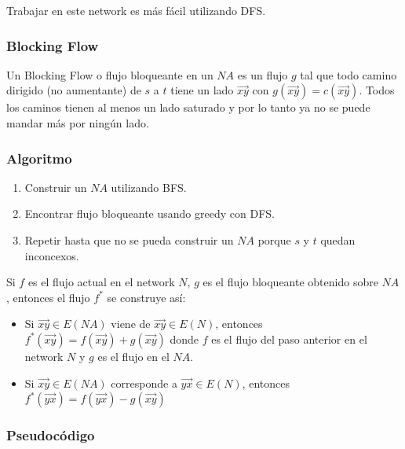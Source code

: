 \documentclass[10pt,a4paper]{article}
\begin{document}
Trabajar en este network es más fácil utilizando DFS.

\subsubsection*{Blocking Flow}

Un Blocking Flow o flujo bloqueante en un $NA$ es un flujo $g$ tal que todo camino dirigido (no aumentante) de $s$ a $t$ tiene un lado $\overrightarrow{xy}$ con $g(\overrightarrow{xy}) = c(\overrightarrow{xy})$. Todos los caminos tienen al menos un lado saturado y por lo tanto ya no se puede mandar más por ningún lado.

\subsubsection*{Algoritmo}

\begin{enumerate}

	\item Construir un $NA$ utilizando BFS.
	\item Encontrar flujo bloqueante usando greedy con DFS.
	\item Repetir hasta que no se pueda construir un $NA$ porque $s$ y $t$ quedan inconcexos.
\end{enumerate}

Si $f$ es el flujo actual en el network $N$, $g$ es el flujo bloqueante obtenido sobre $NA$, entonces el flujo $f^*$ se construye así:

\begin{itemize}

	\item Si $\overrightarrow{xy}\in E(NA)$ viene de $\overrightarrow{xy} \in E(N)$, entonces $f^*(\overrightarrow{xy}) = f(\overrightarrow{xy}) + g(\overrightarrow{xy})$ donde $f$ es el flujo del paso anterior en el network $N$ y $g$ es el flujo en el $NA$.
	\item Si $\overrightarrow{xy} \in E(NA)$ corresponde a $\overrightarrow{yx} \in E(N)$, entonces $f^*(\overrightarrow{yx}) = f(\overrightarrow{yx}) - g(\overrightarrow{xy})$
\end{itemize}

\subsubsection*{Pseudocódigo}
\end{document}

